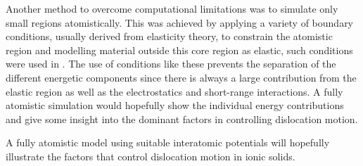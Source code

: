 Another method to overcome computational limitations was to simulate only small regions atomistically. This was achieved by applying a variety of boundary conditions, usually derived from elasticity theory, to constrain the atomistic region and modelling material outside this core region as elastic, such conditions were used in \cite{Woo1977}. The use of conditions like these prevents the separation of the different energetic components since there is always a large contribution from the elastic region as well as the electrostatics and short-range interactions. A fully atomistic simulation would hopefully show the individual energy contributions and give some insight into the dominant factors in controlling dislocation motion.

A fully atomistic model using suitable interatomic potentials will hopefully illustrate the factors that control dislocation motion in ionic solids.

































